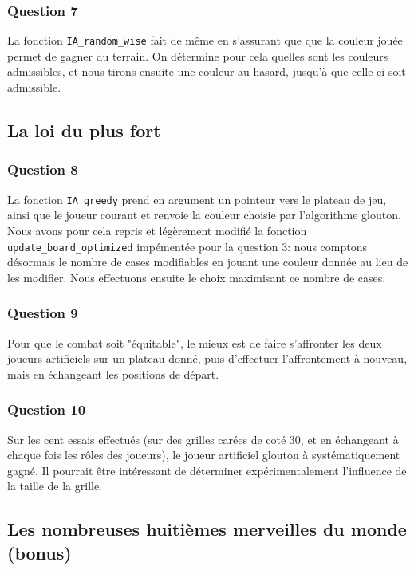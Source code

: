 \documentclass[12pt,a4paper,twoside]{article}
\begin{document}
\subsubsection*{Question 7}
\label{sec:orgheadline14}
La fonction \texttt{IA\_random\_wise} fait de même en s'assurant que
que la couleur jouée permet de gagner du terrain. On détermine pour
cela quelles sont les couleurs admissibles, et nous tirons ensuite
une couleur au hasard, jusqu'à que celle-ci soit admissible.
\subsection{La loi du plus fort}
\label{sec:orgheadline19}
\subsubsection*{Question 8}
\label{sec:orgheadline16}
La fonction \texttt{IA\_greedy} prend en argument un pointeur vers
le plateau de jeu, ainsi que le joueur courant et renvoie la couleur
choisie par l'algorithme glouton.  Nous avons pour cela repris et
légèrement modifié la fonction \texttt{update\_board\_optimized}
impémentée pour la question 3: nous comptons désormais le nombre de
cases modifiables en jouant une couleur donnée au lieu de les
modifier. Nous effectuons ensuite le choix maximisant ce nombre de
cases.
\subsubsection*{Question 9}
\label{sec:orgheadline17}
Pour que le combat soit "équitable", le mieux est de faire s'affronter
les deux joueurs artificiels sur un plateau donné, puis d'effectuer
l'affrontement à nouveau, mais en échangeant les positions de départ.
\subsubsection*{Question 10}
\label{sec:orgheadline18}
Sur les cent essais effectués (sur des grilles carées de coté 30, et
en échangeant à chaque fois les rôles des joueurs), le
joueur artificiel glouton à systématiquement gagné. 
Il pourrait être intéressant de déterminer expérimentalement
l'influence de la taille de la grille.
\subsection{Les nombreuses huitièmes merveilles du monde (bonus)}
\label{sec:orgheadline22}
\end{document}
